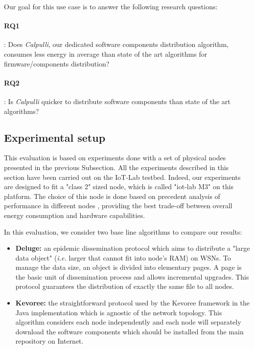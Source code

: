 Our goal for this use case is to answer the following research questions: 
\paragraph{RQ1}: Does \textit{Calpulli}, our dedicated software components distribution algorithm, consumes less energy in average than state of the art algorithms for firmware/components distribution?

\paragraph{RQ2}: Is \textit{Calpulli} quicker to distribute software components than state of the art algorithms?

\subsection{Experimental setup}
This evaluation is based on experiments done with a set of physical nodes presented in the previous Subsection.
All the experiments described in this section have been carried out on the IoT-Lab testbed\cite{Fleury15iotlab}.
Indeed, our experiments are designed to fit a "class 2" sized node, which is called "iot-lab M3" on this platform.
The choice of this node is done based on precedent analysis of performance in different nodes \cite{tsekoura2014evaluation}, providing the best trade-off between overall energy consumption and hardware capabilities.

In this evaluation, we consider two base line algorithms to compare our results:
\begin{itemize}
	\item \textbf{Deluge:} an epidemic dissemination protocol \cite{hui2004dynamic} which aims to distribute a "large data object" (\textit{i.e.} larger that cannot fit into node's RAM) on WSNs. To manage the data size, an object is divided into elementary pages. A page is the basic unit of dissemination process and allows incremental upgrades. This protocol guarantees the distribution of exactly the same file to all nodes.
	\item \textbf{Kevoree:} the straightforward protocol used by the Kevoree framework \cite{fouquet2013kevoree} in the Java implementation which is agnostic of the network topology. 
	This algorithm considers each node independently and each node will separately download the software components which should be installed from the main repository on Internet.
\end{itemize}

